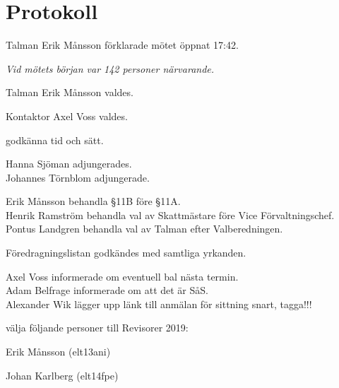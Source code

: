 \documentclass[10pt]{article}
\def\mo{Erik Månsson}
\def\ms{Axel Voss}
\begin{document}
\newpage

\section*{Protokoll}
\begin{paragrafer}
Talman {\mo} förklarade mötet öppnat 17:42.

\emph{Vid mötets början var 142 personer närvarande.}

Talman {\mo} valdes.

Kontaktor {\ms} valdes.


\Mba godkänna tid och sätt.


\valavj


Hanna Sjöman adjungerades.\\
Johannes Törnblom adjungerade.


Erik Månsson \ypa behandla \S11B före \S11A.\\
Henrik Ramström \ypa behandla val av Skattmästare före Vice Förvaltningschef.\\
Pontus Landgren \ypa behandla val av Talman efter Valberedningen.

Föredragningslistan godkändes med samtliga yrkanden.

	\ingaprot


Axel Voss informerade om eventuell bal nästa termin.\\
Adam Belfrage informerade om att det är SåS.\\
Alexander Wik lägger upp länk till anmälan för sittning snart, tagga!!! 

\newpage
{}
\begin{paralist}

    \Mba välja följande personer till Revisorer 2019:
    \begin{tightdashlist}
        \item Erik Månsson (elt13ani)
        \item Johan Karlberg (elt14fpe)
    \end{tightdashlist}


\end{paralist}
\end{paragrafer}
\end{document}
